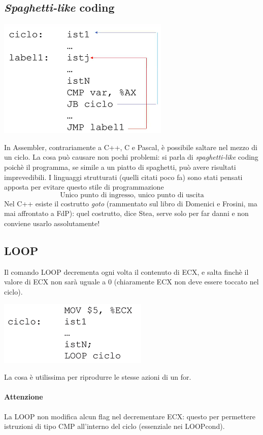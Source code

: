 \documentclass[11pt]{report}
\begin{document}
\subsection{\emph{Spaghetti-like} coding}
\begin{center}
\includegraphics{img/53.PNG}
\end{center}
In Assembler, contrariamente a C++, C e Pascal, è possibile saltare nel mezzo di un ciclo. La cosa può causare non pochi problemi: si parla di \emph{spaghetti-like} coding poichè il programma, se simile a un piatto di spaghetti, può avere risultati imprevedibili. I linguaggi strutturati (quelli citati poco fa) sono stati pensati apposta per evitare questo stile di programmazione
\[\text{Unico punto di ingresso, unico punto di uscita}\]
Nel C++ esiste il costrutto \emph{goto} (rammentato sul libro di Domenici e Frosini, ma mai affrontato a FdP): quel costrutto, dice Stea, serve solo per far danni e non conviene usarlo assolutamente!
\clearpage

\subsection{LOOP}
Il comando LOOP decrementa ogni volta il contenuto di ECX, e salta finchè il valore di ECX non sarà uguale a 0 (chiaramente ECX non deve essere toccato nel ciclo).
\begin{center}
\includegraphics{img/54.PNG}
\end{center}
La cosa è utilissima per riprodurre le stesse azioni di un for. 
\paragraph{Attenzione} La LOOP non modifica alcun flag nel decrementare ECX: questo per permettere istruzioni di tipo CMP all'interno del ciclo (essenziale nei LOOPcond).
\end{document}
